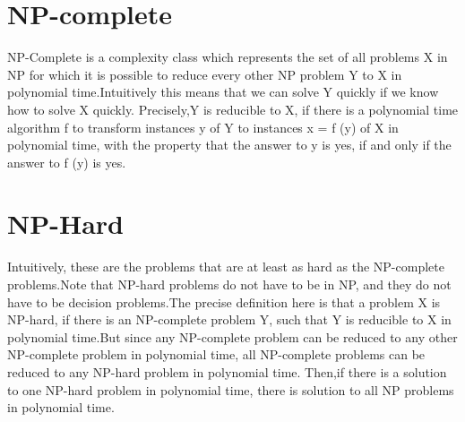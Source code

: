 \section{NP-complete}
\noindent
NP-Complete is a complexity class which represents the set of all problems X in NP
for which it is possible to reduce every other NP problem Y to X in polynomial
time.Intuitively this means that we can solve Y quickly if we know how to solve
X quickly. Precisely,Y is reducible to X, if there is a polynomial time algorithm f
to transform instances y of Y to instances x = f (y) of X in polynomial time, with the
property that the answer to y is yes, if and only if the answer to f (y) is yes.
\section{NP-Hard}
\noindent

Intuitively, these are the problems that are at least as hard as
the NP-complete problems.Note that NP-hard problems do not have to be in NP,
and they do not have to be decision problems.The precise definition here is that
a problem X is NP-hard, if there is an NP-complete problem Y, such that Y is reducible
to X in polynomial time.But since any NP-complete problem can be reduced to any
other NP-complete problem in polynomial time, all NP-complete problems can be
reduced to any NP-hard problem in polynomial time. Then,if there is a solution to
one NP-hard problem in polynomial time, there is solution to all NP problems in
polynomial time.